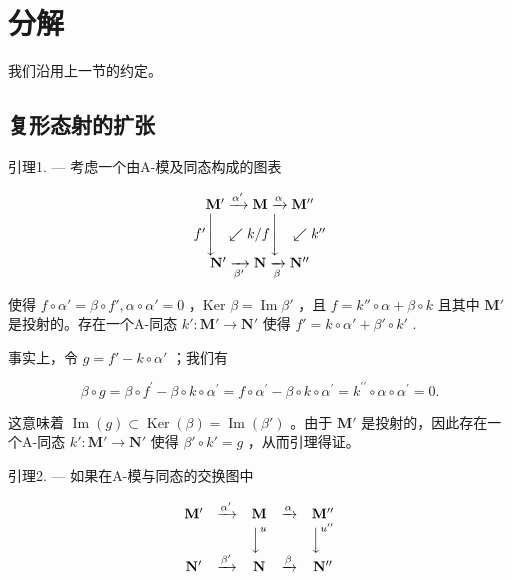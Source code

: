 \section{分解}

我们沿用上一节的约定。

\subsection{复形态射的扩张}

引理1. --- 考虑一个由A-模及同态构成的图表

\[
\begin{array}{c} \mathbf {M} ^ {\prime} \xrightarrow {\alpha^ {\prime}} \mathbf {M} \xrightarrow {\alpha} \mathbf {M} ^ {\prime \prime} \\ f ^ {\prime} \Biggl \downarrow \quad \swarrow k / f \Biggl \downarrow \quad \swarrow k ^ {\prime \prime} \\ \mathbf {N} ^ {\prime} \xrightarrow [ \beta^ {\prime} ]{} \mathbf {N} \xrightarrow [ \beta ]{} \mathbf {N} ^ {\prime \prime} \end{array}
\]

使得 \(f \circ \alpha' = \beta \circ f', \alpha \circ \alpha' = 0\) ，Ker \(\beta = \operatorname{Im} \beta'\) ，且 \(f = k'' \circ \alpha + \beta \circ k\) 且其中 \(\mathbf{M}'\) 是投射的。存在一个A-同态 \(k': \mathbf{M}' \to \mathbf{N}'\) 使得 \(f' = k \circ \alpha' + \beta' \circ k'\) .

事实上，令 \(g = f' - k \circ \alpha'\) ；我们有

\[
\beta \circ g = \beta \circ f ^ {\prime} - \beta \circ k \circ \alpha^ {\prime} = f \circ \alpha^ {\prime} - \beta \circ k \circ \alpha^ {\prime} = k ^ {\prime \prime} \circ \alpha \circ \alpha^ {\prime} = 0.
\]

这意味着 \(\operatorname{Im}(g) \subset \operatorname{Ker}(\beta) = \operatorname{Im}(\beta')\) 。由于 \(\mathbf{M}'\) 是投射的，因此存在一个A-同态 \(k': \mathbf{M}' \to \mathbf{N}'\) 使得 \(\beta' \circ k' = g\) ，从而引理得证。

引理2. --- 如果在A-模与同态的交换图中

\[
\begin{array}{c c c c c} \mathbf {M} ^ {\prime} & \xrightarrow {\alpha^ {\prime}} & \mathbf {M} & \xrightarrow {\alpha} & \mathbf {M} ^ {\prime \prime} \\ & & \Big \downarrow^ {u} & & \Big \downarrow^ {u ^ {\prime \prime}} \\ \mathbf {N} ^ {\prime} & \xrightarrow {\beta^ {\prime}} & \mathbf {N} & \xrightarrow {\beta} & \mathbf {N} ^ {\prime \prime} \end{array}
\]

